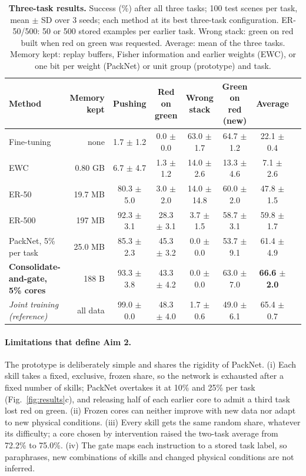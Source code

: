 \documentclass[11pt]{article}
\begin{document}
\begin{table}[h]
\centering
\caption{\textbf{Three-task results.} Success (\%) after all three tasks; 100 test scenes per task, mean $\pm$ SD over 3
seeds; each method at its best three-task configuration. ER-50/500: 50 or 500 stored examples per earlier task. Wrong
stack: green on red built when red on green was requested. Average: mean of the three tasks. Memory kept: replay
buffers, Fisher information and earlier weights (EWC), or one bit per weight (PackNet) or unit group (prototype) and
task.}
\label{tab:three}
\footnotesize
\setlength{\tabcolsep}{5pt}
\begin{tabular}{@{}lrcccccc@{}}
\toprule
Method & Memory kept & Pushing & Red on green & Wrong stack & Green on red (new) & Average \\
\midrule
Fine-tuning & none & 1.7 $\pm$ 1.2 & 0.0 $\pm$ 0.0 & 63.0 $\pm$ 1.7 & 64.7 $\pm$ 1.2 & 22.1 $\pm$ 0.4 \\
EWC \citep{kirkpatrick2017ewc} & 0.80 GB & 6.7 $\pm$ 4.7 & 1.3 $\pm$ 1.2 & 14.0 $\pm$ 2.6 & 13.3 $\pm$ 4.6 & 7.1 $\pm$ 2.6 \\
ER-50 & 19.7 MB & 80.3 $\pm$ 5.0 & 3.0 $\pm$ 2.0 & 14.0 $\pm$ 14.8 & 60.0 $\pm$ 2.0 & 47.8 $\pm$ 1.5 \\
ER-500 & 197 MB & 92.3 $\pm$ 3.1 & 28.3 $\pm$ 3.1 & 3.7 $\pm$ 1.5 & 58.7 $\pm$ 3.1 & 59.8 $\pm$ 1.7 \\
PackNet, 5\% per task & 25.0 MB & 85.3 $\pm$ 2.3 & 45.3 $\pm$ 3.2 & 0.0 $\pm$ 0.0 & 53.7 $\pm$ 9.1 & 61.4 $\pm$ 4.9 \\
\rowcolor{oursrow}\textbf{Consolidate-and-gate, 5\% cores} & 188 B & 93.3 $\pm$ 3.8 & 43.3 $\pm$ 4.2 & 0.0 $\pm$ 0.0 & 63.0 $\pm$ 7.0 & \textbf{66.6 $\pm$ 2.0} \\
\midrule
\textit{Joint training (reference)} & all data & 99.0 $\pm$ 0.0 & 48.3 $\pm$ 4.0 & 1.7 $\pm$ 0.6 & 49.0 $\pm$ 6.1 & 65.4 $\pm$ 0.7 \\
\bottomrule
\end{tabular}
\end{table}

\paragraph{Limitations that define Aim 2.} The prototype is deliberately simple and shares the rigidity of PackNet.
(i) Each skill takes a fixed, exclusive, frozen share, so the network is exhausted after a fixed number of skills;
PackNet overtakes it at 10\% and 25\% per task (Fig.~\ref{fig:results}c), and releasing half of each earlier core to
admit a third task lost red on green. (ii) Frozen cores can neither improve with new data nor adapt to new physical
conditions. (iii) Every skill gets the same random share, whatever its difficulty; a core chosen by intervention raised
the two-task average from 72.2\% to 75.0\%. (iv) The gate maps each instruction to a stored task label, so paraphrases,
new combinations of skills and changed physical conditions are not inferred.
\end{document}
